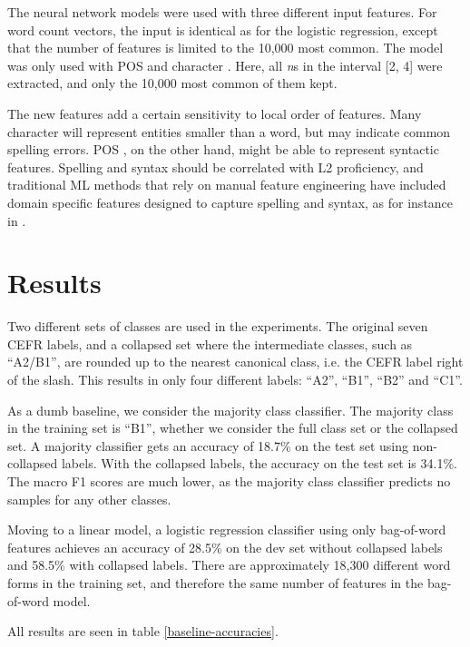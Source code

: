 The neural network models were used with three different input features. For
word count vectors, the input is identical as for the logistic regression,
except that the number of features is limited to the 10,000 most common. 
The model was only used with \ac{POS} and character \ngrams. Here, all 
\textit{n}s in the interval [2, 4] were extracted, and only the 10,000 most
common of them kept.

The new \ngram features add a certain sensitivity to local order of features.
Many character \ngrams will represent entities smaller than a word, but may
indicate common spelling errors. \ac{POS} \ngrams, on the other hand, might
be able to represent syntactic features. Spelling and syntax should be
correlated with L2 proficiency, and traditional \ac{ML} methods that rely on
manual feature engineering have included domain specific features designed to
capture spelling and syntax, as for instance in \textcite{vajjala17}.


\section{Results}

Two different sets of classes are used in the experiments. The original seven
CEFR labels, and a collapsed set where the intermediate classes, such as
``A2/B1'', are rounded up to the nearest canonical class, i.e. the CEFR label
right of the slash. This results in only four different labels: ``A2'',
``B1'', ``B2'' and ``C1''.

As a dumb baseline, we consider the majority class classifier. The majority
class in the training set is ``B1'', whether we consider the full class set
or the collapsed set. A majority classifier gets an accuracy of 18.7\% on the
test set using non-collapsed labels. With the collapsed labels, the accuracy
on the test set is 34.1\%. The macro F1 scores are much lower, as the
majority class classifier predicts no samples for any other classes.

Moving to a linear model, a logistic regression classifier using only
bag-of-word features achieves an accuracy of 28.5\% on the dev set without
collapsed labels and 58.5\% with collapsed labels. There are approximately
18,300 different word forms in the training set, and therefore the same
number of features in the bag-of-word model.

All results are seen in table \ref{baseline-accuracies}.

